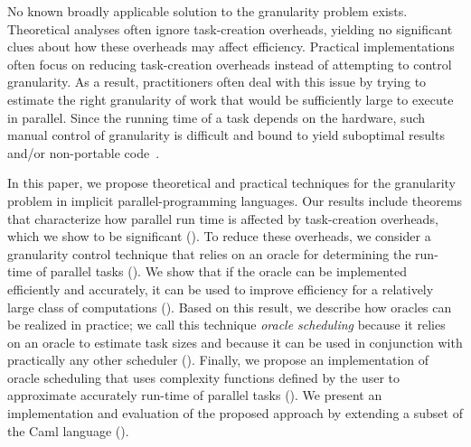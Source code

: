 No known broadly applicable solution to the granularity problem
exists. Theoretical analyses often ignore task-creation overheads,
yielding no significant clues about how these overheads may affect
efficiency.  Practical implementations often focus on reducing
task-creation overheads instead of attempting to control granularity.
As a result, practitioners often deal with this issue by trying to
estimate the right granularity of work that would be sufficiently
large to execute in parallel.  
%
Since the running time of a task depends on the hardware, such manual
control of granularity is difficult
and bound to yield suboptimal results and/or non-portable
code~\cite{lazy-binary-splitting}.



In this paper, we propose theoretical and practical techniques for the
granularity problem in implicit parallel-programming languages.  Our
results include theorems that characterize how parallel run time is
affected by task-creation overheads, which we show to be significant
().  To reduce these overheads, we consider
a granularity control technique that relies on an oracle for
determining the run-time of parallel tasks ().  We
show that if the oracle can be implemented efficiently and accurately,
it can be used to improve efficiency for a relatively large class of
computations (). 
Based on this result, we describe how oracles can be
realized in practice; we call this technique {\em oracle scheduling}
because it relies on an oracle to estimate task sizes and because it
can be used in conjunction with practically any other scheduler
().  Finally, we propose an implementation of oracle
scheduling that uses complexity functions defined by the user to
approximate accurately run-time of parallel tasks ().
We present an implementation and evaluation of the proposed approach
by extending a subset of the Caml language ().

